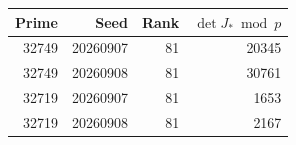 \begin{center}\begin{tabular}{rrrr}
\toprule Prime & Seed & Rank & $\det J_*\bmod p$\\\midrule
32749 & 20260907 & 81 & 20345\\
32749 & 20260908 & 81 & 30761\\
32719 & 20260907 & 81 & 1653\\
32719 & 20260908 & 81 & 2167\\
\bottomrule\end{tabular}\end{center}
